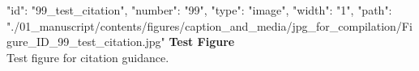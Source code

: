 {
    "id": "99_test_citation",
    "number": "99",
    "type": "image",
    "width": "1\textwidth",
    "path": "./01_manuscript/contents/figures/caption_and_media/jpg_for_compilation/Figure_ID_99_test_citation.jpg"
}
\textbf{Test Figure}\smallskip\\Test figure for citation guidance.
